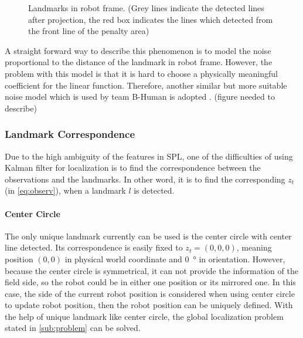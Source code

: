 \begin{figure}[h!]
  \centering
{}
  \caption{Landmarks in robot frame. (Grey lines indicate the detected lines after projection, the red box indicates the lines which detected from the front line of the penalty area)}
  \label{fig:landmarkRobotFrame}
\end{figure}

A straight forward way to describe this phenomenon is to model the noise proportional to the distance of the landmark in robot frame. However, the problem with this model is that it is hard to choose a physically meaningful coefficient for the linear function. Therefore, another similar but more suitable noise model which is used by team B-Human is adopted \cite{Bhuman}. (figure needed to describe)


\subsubsection{Landmark Correspondence}
Due to the high ambiguity of the features in \gls{SPL}, one of the difficulties of using Kalman filter for localization is to find the correspondence between the observations and the landmarks. In other word, it is to find the corresponding $z_t$ (in \autoref{eq:observ}), when a landmark $l$ is detected. 

\paragraph{Center Circle}
The only unique landmark currently can be used is the center circle with center line detected. Its correspondence is easily fixed to $z_t = (0,0,0)$, meaning position $(0,0)$ in physical world coordinate and \SI{0}{\degree} in orientation. However, because the center circle is symmetrical, it can not provide the information of the field side, so the robot could be in either one position or its mirrored one. In this case, the side of the current robot position is considered when using center circle to update robot position, then the robot position can be uniquely defined. With the help of unique landmark like center circle, the global localization problem stated in \autoref{sub:problem} can be solved.


